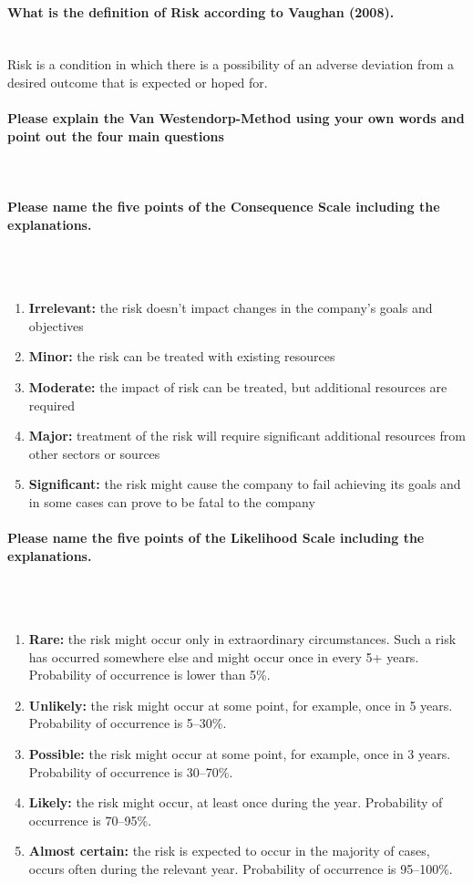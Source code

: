 \documentclass[10pt,a4paper,noendnumber=true]{scrartcl}
\newcommand{\properparagraph}[1]{\paragraph{\textcolor{Emerald}{#1}}\mbox{}\\}
\begin{document}
\properparagraph{What is the definition of Risk according to Vaughan (2008).}
Risk is a condition in which there is a possibility of an adverse deviation from a desired outcome that is expected or hoped for.

\properparagraph{Please explain the Van Westendorp-Method using your own words and point out the four main questions}

\properparagraph{Please name the five points of the Consequence Scale including the explanations.}
\\[-6ex]
\begin{enumerate}
	\item  \textbf{Irrelevant:} the risk doesn’t impact changes in the company’s goals
	and objectives
	\item  \textbf{Minor:} the risk can be treated with existing resources
	\item  \textbf{Moderate:} the impact of risk can be treated, but additional resources
	are required
	\item  \textbf{Major:} treatment of the risk will require significant additional
	resources from other sectors or sources
	\item  \textbf{Significant:} the risk might cause the company to fail achieving its
	goals and in some cases can prove to be fatal to the company
\end{enumerate}


\properparagraph{Please name the five points of the Likelihood Scale including the explanations.}
\\[-6ex]
\begin{enumerate}
	\item  \textbf{Rare:} the risk might occur only in extraordinary circumstances. Such a
	risk has occurred somewhere else and might occur once in every 5+ years.
	Probability of occurrence is lower than 5\%.
	\item  \textbf{Unlikely:} the risk might occur at some point, for example, once in 5
	years. Probability of occurrence is 5–30\%.
	\item  \textbf{Possible:} the risk might occur at some point, for example, once in 3
	years. Probability of occurrence is 30–70\%.
	\item  \textbf{Likely:} the risk might occur, at least once during the year. Probability of
	occurrence is 70–95\%.
	\item  \textbf{Almost certain:} the risk is expected to occur in the majority of cases,	occurs often during the relevant year. Probability of occurrence is 95–100\%.
\end{enumerate}
\end{document}
